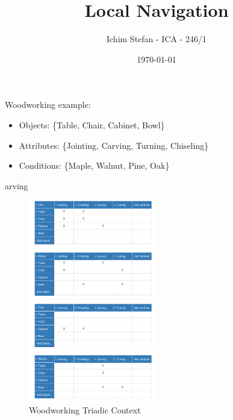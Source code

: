 \documentclass{article}
\title{Local Navigation}
\author{Ichim Stefan - ICA - 246/1}
\date{\today}
\begin{document}
\maketitle

Woodworking example:
\begin{itemize}
  \item Objects: \{Table, Chair, Cabinet, Bowl\}
  \item Attributes: \{Jointing, Carving, Turning, Chiseling\}
  \item Conditions: \{Maple, Walnut, Pine, Oak\}
\end{itemize}arving

\begin{figure}[htbp]
  \centering
  \includegraphics[width=0.5\textwidth]{context.png}
  \caption{Woodworking Triadic Context}
  \label{fig:context}
\end{figure}
\end{document}
